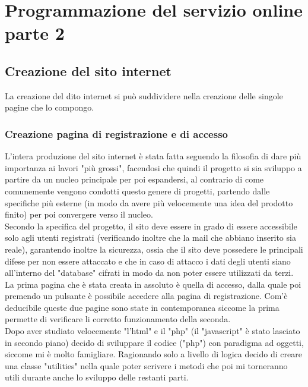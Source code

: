 \chapter{Programmazione del servizio online parte 2}\label{cap:Programmazione del servizio online parte 2}

\section{Creazione del sito internet}\label{sez:Creazione sito internet}

La creazione del dito internet si può suddividere nella creazione delle singole pagine che lo compongo.

\subsection{Creazione pagina di registrazione e di accesso}
L'intera produzione del sito internet è stata fatta seguendo la filosofia di dare più importanza ai lavori "più grossi", facendosi che quindi il progetto si sia sviluppo a partire da un nucleo principale per poi espandersi, al contrario di  come comunemente vengono condotti questo genere di progetti, partendo dalle specifiche più esterne (in modo da avere più velocemente una idea del prodotto finito) per poi convergere verso il nucleo.\\
Secondo la specifica del progetto, il sito deve essere in grado di essere accessibile solo agli utenti registrati (verificando inoltre che la mail che abbiano inserito sia reale), garantendo inoltre la sicurezza, ossia che il sito deve possedere le principali difese per non essere attaccato e che in caso di attacco i dati degli utenti siano all'interno del "database" cifrati in modo da non poter essere utilizzati da terzi.\\
La prima pagina che è stata creata in assoluto è quella di accesso, dalla quale poi premendo un  pulsante è possibile accedere alla pagina di registrazione. Com'è deducibile queste due pagine sono state in contemporanea siccome la prima permette di verificare li corretto funzionamento della seconda.\\

Dopo aver studiato velocemente "l'html" e il "php" (il "javascript" è stato lasciato in secondo piano) decido di sviluppare il codice ("php") con paradigma ad oggetti, siccome mi è molto famigliare. Ragionando solo a livello di logica decido di creare una classe "utilities" nella quale poter scrivere i metodi che poi mi torneranno utili durante anche lo sviluppo delle restanti parti. \\

